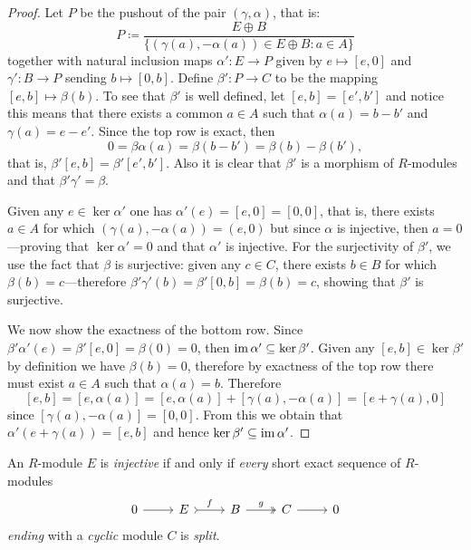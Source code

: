 \begin{proof}
    Let \(P\) be the pushout of the pair \((\gamma, \alpha)\), that is:
    \[
        P \coloneq
        \frac{E \oplus B}{\{(\gamma(a), - \alpha(a)) \in E \oplus B \colon a \in A\}}
    \]
    together with natural inclusion maps \(\alpha': E \to P\) given by
    \(e \mapsto [e, 0]\) and \(\gamma': B \to P\) sending \(b \mapsto [0,
        b]\). Define \(\beta': P \to C\) to be the mapping \([e, b] \mapsto
    \beta(b)\). To see that \(\beta'\) is well defined, let \([e, b] = [e', b']\)
    and notice this means that there exists a common \(a \in A\) such that
    \(\alpha(a) = b - b'\) and \(\gamma(a) = e - e'\). Since the top row is exact,
    then
    \[
        0 = \beta\alpha(a) = \beta(b - b') = \beta(b) - \beta(b'),
    \]
    that is, \(\beta'[e, b] = \beta'[e', b']\). Also it is clear that \(\beta'\) is
    a morphism of \(R\)-modules and that \(\beta' \gamma' = \beta\).

    Given any \(e \in \ker \alpha'\) one has \(\alpha'(e) = [e, 0] = [0, 0]\), that
    is, there exists \(a \in A\) for which \((\gamma(a), -\alpha(a)) = (e, 0)\) but
    since \(\alpha\) is injective, then \(a = 0\)---proving that
    \(\ker \alpha' = 0\) and that \(\alpha'\) is injective. For the surjectivity of
    \(\beta'\), we use the fact that \(\beta\) is surjective: given any \(c \in C\),
    there exists \(b \in B\) for which \(\beta(b) = c\)---therefore
    \(\beta' \gamma'(b) = \beta'[0, b] = \beta(b) = c\), showing that \(\beta'\) is
    surjective.

    We now show the exactness of the bottom row. Since
    \(\beta'\alpha'(e) = \beta'[e, 0] = \beta(0) = 0\), then
    \(\operatorname{im} \alpha' \subseteq \ker \beta'\). Given any \([e, b] \in \ker \beta'\) by
    definition we have \(\beta(b) = 0\), therefore by exactness of the top row there
    must exist \(a \in A\) such that \(\alpha(a) = b\). Therefore
    \[
        [e, b] = [e, \alpha(a)]
        = [e, \alpha(a)] + [\gamma(a), -\alpha(a)]
        = [e + \gamma(a), 0]
    \]
    since \([\gamma(a), -\alpha(a)] = [0, 0]\). From this we obtain that
    \(\alpha'(e + \gamma(a)) = [e, b]\) and hence
    \(\ker \beta' \subseteq \operatorname{im} \alpha'\).
\end{proof}

\begin{proposition}
    \label{prop:injective-iff-split-cyclic}
    An \(R\)-module \(E\) is \emph{injective} if and only if \emph{every} short
    exact sequence of \(R\)-modules
    \[
        \begin{tikzcd}
            0 \ar[r] &E \ar[r, tail, "f"] &B \ar[r, two heads, "g"] &C \ar[r] &0
        \end{tikzcd}
    \]
    \emph{ending} with a \emph{cyclic} module \(C\) is \emph{split}.
\end{proposition}

